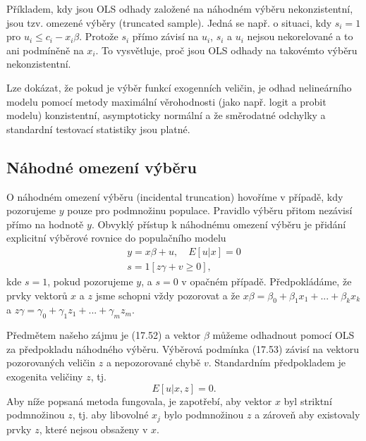 Příkladem, kdy jsou OLS odhady založené na náhodném výběru nekonzistentní, jsou tzv. omezené výběry (truncated sample). Jedná se např. o situaci, kdy $s_i = 1$ pro $u_i \le c_i - x_i \beta$. Protože $s_i$ přímo závisí na $u_i$, $s_i$ a $u_i$ nejsou nekorelované a to ani podmíněně na $x_i$. To vysvětluje, proč jsou OLS odhady na takovémto výběru nekonzistentní.

Lze dokázat, že pokud je výběr funkcí exogenních veličin, je odhad nelineárního modelu pomocí metody maximální věrohodnosti (jako např. logit a  probit modelu) konzistentní, asymptoticky normální a že směrodatné odchylky a standardní testovací statistiky jsou platné.

\subsection{Náhodné omezení výběru}

O náhodném omezení výběru (incidental truncation) hovoříme v případě, kdy pozorujeme $y$ pouze pro podmnožinu populace. Pravidlo výběru přitom nezávisí přímo na hodnotě $y$. Obvyklý přístup k náhodnému omezení výběru je přidání explicitní výběrové rovnice do populačního modelu
\begin{gather}
y = x \beta + u, \quad E[u|x] = 0\\
s = 1[z \gamma + v \ge 0],
\end{gather}
kde $s = 1$, pokud pozorujeme $y$, a $s = 0$ v opačném případě. Předpokládáme, že prvky vektorů $x$ a $z$ jsme schopni vždy pozorovat a že $x \beta = \beta_0 + \beta_1 x_1 + ... + \beta_k x_k$ a $z \gamma = \gamma_0 + \gamma_1 z_1 + ... + \gamma_m z_m$.

Předmětem našeho zájmu je (17.52) a vektor $\beta$ můžeme odhadnout pomocí OLS za předpokladu náhodného výběru. Výběrová podmínka (17.53) závisí na vektoru pozorovaných veličin $z$ a nepozorované chybě $v$. Standardním předpokladem je exogenita veličiny $z$, tj.
\begin{equation}
E[u |x,z] = 0.
\end{equation}
Aby níže popsaná metoda fungovala, je zapotřebí, aby vektor $x$ byl striktní podmnožinou $z$, tj. aby libovolné $x_j$ bylo podmnožinou $z$ a zároveň aby existovaly prvky $z$, které nejsou obsaženy v $x$.

